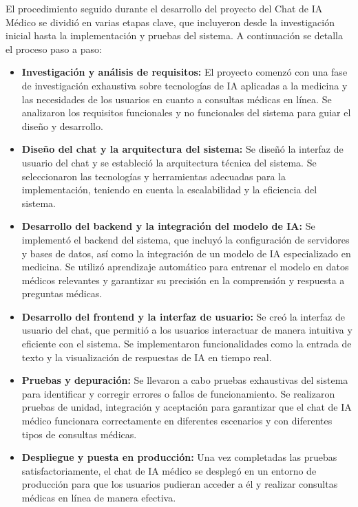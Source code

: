 \documentclass[conference]{IEEEtran}
\begin{document}
El procedimiento seguido durante el desarrollo del proyecto del Chat de IA Médico se dividió en varias etapas clave, que incluyeron desde la investigación inicial hasta la implementación y pruebas del sistema. A continuación se detalla el proceso paso a paso:


\begin{itemize}
    \item \textbf{Investigación y análisis de requisitos:} El proyecto comenzó con una fase de investigación exhaustiva sobre tecnologías de IA aplicadas a la medicina y las necesidades de los usuarios en cuanto a consultas médicas en línea. Se analizaron los requisitos funcionales y no funcionales del sistema para guiar el diseño y desarrollo.
    
    \item \textbf{Diseño del chat y la arquitectura del sistema:} Se diseñó la interfaz de usuario del chat y se estableció la arquitectura técnica del sistema. Se seleccionaron las tecnologías y herramientas adecuadas para la implementación, teniendo en cuenta la escalabilidad y la eficiencia del sistema.
    
    \item \textbf{Desarrollo del backend y la integración del modelo de IA:} Se implementó el backend del sistema, que incluyó la configuración de servidores y bases de datos, así como la integración de un modelo de IA especializado en medicina. Se utilizó aprendizaje automático para entrenar el modelo en datos médicos relevantes y garantizar su precisión en la comprensión y respuesta a preguntas médicas.
    
    \item \textbf{Desarrollo del frontend y la interfaz de usuario:} Se creó la interfaz de usuario del chat, que permitió a los usuarios interactuar de manera intuitiva y eficiente con el sistema. Se implementaron funcionalidades como la entrada de texto y la visualización de respuestas de IA en tiempo real.
    
    \item \textbf{Pruebas y depuración:} Se llevaron a cabo pruebas exhaustivas del sistema para identificar y corregir errores o fallos de funcionamiento. Se realizaron pruebas de unidad, integración y aceptación para garantizar que el chat de IA médico funcionara correctamente en diferentes escenarios y con diferentes tipos de consultas médicas.
    
    \item \textbf{Despliegue y puesta en producción:} Una vez completadas las pruebas satisfactoriamente, el chat de IA médico se desplegó en un entorno de producción para que los usuarios pudieran acceder a él y realizar consultas médicas en línea de manera efectiva.
    
\end{itemize}
\end{document}
